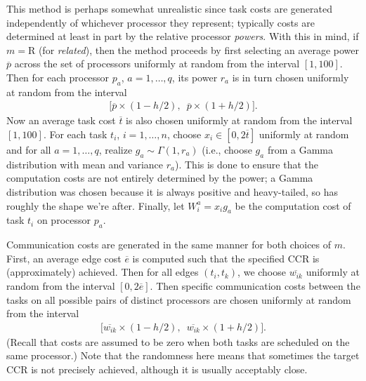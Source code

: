 \documentclass[12pt]{article}
\begin{document}
This method is perhaps somewhat unrealistic since task costs are generated independently of whichever processor they represent; typically costs are determined at least in part by the relative processor {\em powers}. With this in mind, if $m = \text{R}$ (for {\em related}), then the method proceeds by first selecting an average power $\overline{p}$ across the set of processors uniformly at random from the interval $[1, 100]$. Then for each processor $p_a$, $a = 1, \dots, q$, its power $r_a$ is in turn chosen uniformly at random from the interval
\begin{align*}
\big[ \overline{p} \times (1 - h/2), \enspace \overline{p} \times (1 + h/2)     \big].
\end{align*}  
Now an average task cost $\overline{t}$ is also chosen uniformly at random from the interval $[1, 100]$. For each task $t_i$, $i = 1, \dots, n$, choose $x_i \in [0, 2\overline{t}]$ uniformly at random and for all $a = 1, \dots, q$, realize $g_a \sim \Gamma(1, r_a)$ (i.e., choose $g_a$ from a Gamma distribution with mean and variance $r_a$). This is done to ensure that the computation costs are not entirely determined by the power; a Gamma distribution was chosen because it is always positive and heavy-tailed, so has roughly the shape we're after.  Finally, let $W_i^a = x_i g_a$ be the computation cost of task $t_i$ on processor $p_a$. 

Communication costs are generated in the same manner for both choices of $m$. First, an average edge cost $\overline{e}$ is computed such that the specified CCR is (approximately) achieved. Then for all edges $(t_i, t_k)$, we choose $\overline{w_{ik}}$ uniformly at random from the interval $[0, 2\overline{e}]$. Then specific communication costs between the tasks on all possible pairs of distinct processors are chosen uniformly at random from the interval    
\begin{align*}
\big[ \overline{w_{ik}} \times (1 - h/2), \enspace \overline{w_{ik}} \times (1 + h/2)   \big].
\end{align*} 
(Recall that costs are assumed to be zero when both tasks are scheduled on the same processor.) Note that the randomness here means that sometimes the target CCR is not precisely achieved, although it is usually acceptably close.

\end{document}
